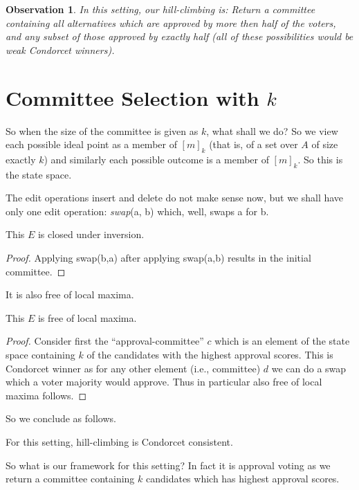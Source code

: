\documentclass{llncs}
\newtheorem{observation}{Observation}
\begin{document}
\begin{observation}
  In this setting, our hill-climbing is:
    Return a committee containing all alternatives which are approved by more then half of the voters, and any subset of those approved by exactly half
    (all of these possibilities would be weak Condorcet winners).
\end{observation}


\section{Committee Selection with $k$}

So when the size of the committee is given as $k$, what shall we do?
So we view each possible ideal point as a member of $[m]_k$ (that is, of a set over $A$ of size exactly $k$) and similarly each possible outcome is a member of $[m]_k$.
So this is the state space.

The edit operations insert and delete do not make sense now, but we shall have only one edit operation: \emph{swap}(a, b) which, well, swaps a for b.

\begin{lemma}
  This $E$ is closed under inversion.
\end{lemma}

\begin{proof}
Applying swap(b,a) after applying swap(a,b) results in the initial committee.
\end{proof}

It is also free of local maxima.

\begin{lemma}
  This $E$ is free of local maxima.
\end{lemma}

\begin{proof}
%
Consider first the ``approval-committee'' $c$ which is an element of the state space containing $k$ of the candidates with the highest approval scores.
This is Condorcet winner as for any other element (i.e., committee) $d$ we can do a swap which a voter majority would approve. Thus in particular also free of local maxima follows.
%
\end{proof}

So we conclude as follows.

\begin{corollary}
  For this setting, hill-climbing is Condorcet consistent.
\end{corollary}

So what is our framework for this setting? In fact it is approval voting as we return a committee containing $k$ candidates which has highest approval scores.
\end{document}
